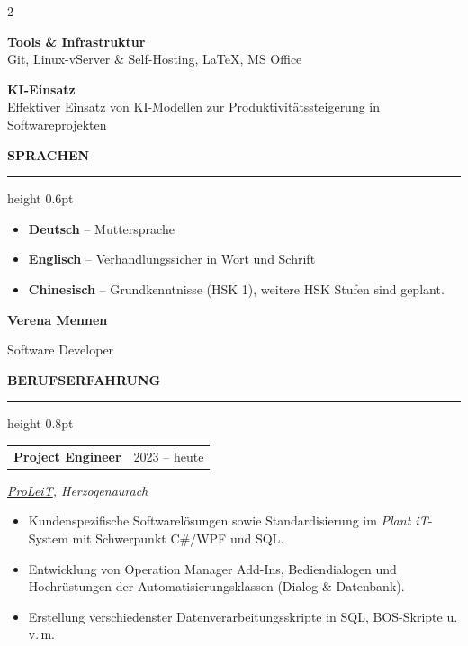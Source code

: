 \documentclass[10pt,a4paper]{article}
\makeatletter
\newcommand{\sideheading}[1]{%
  \vspace{11pt}%
  {\large\bfseries\color{accent}\MakeUppercase{#1}}\par
  \vspace{2pt}%
  {\color{rulecolor}\hrule height 0.6pt}%
  \vspace{6pt}%
}
\newcommand{\mainheading}[1]{%
  \vspace{12pt}%
  {\large\bfseries\color{accent}\MakeUppercase{#1}}\par
  \vspace{2pt}%
  {\color{accent}\hrule height 0.8pt}%
  \vspace{8pt}%
}
\newcommand{\cventry}[2]{%
  \begin{tabularx}{\linewidth}{@{}X@{\hspace{10pt}}r@{}}
    \textbf{#1} & {\small\color{textmuted}#2} \\
  \end{tabularx}\par\vspace{1pt}%
}
\makeatother
\begin{document}
\begin{paracol}{2}
\begin{leftcolumn}
\begin{minipage}[t]{\dimexpr\columnwidth-20pt\relax}
\vspace{6pt}
\textbf{Tools \& Infrastruktur}\\
Git, Linux-vServer \& Self-Hosting, LaTeX, MS Office


\vspace{6pt}
\textbf{KI-Einsatz}\\
Effektiver Einsatz von KI-Modellen zur Produktivitätssteigerung in Softwareprojekten

\sideheading{Sprachen}
\begin{itemize}[leftmargin=10pt, topsep=2pt, itemsep=3pt]
  \item \textbf{Deutsch} -- Muttersprache
  \item \textbf{Englisch} -- Verhandlungssicher in Wort und Schrift
  \item \textbf{Chinesisch} -- Grundkenntnisse (HSK 1), weitere HSK Stufen sind geplant.
\end{itemize}

\end{minipage}
\end{leftcolumn}

\begin{rightcolumn}
\vspace*{4pt}

{\Huge\bfseries\color{accent} Verena Mennen}\par
\vspace{3pt}
{\Large\color{textmuted} Software Developer}\par
\vspace{6pt}

\mainheading{Berufserfahrung}

\cventry{Project Engineer}{2023 -- heute}
{\small\textit{\href{https://www.proleit.de/}{ProLeiT}, Herzogenaurach}}
\begin{itemize}
  \item Kundenspezifische Softwarelösungen sowie Standardisierung im \textit{Plant iT}-System mit Schwerpunkt C\#/WPF und SQL.
  \item Entwicklung von Operation Manager Add-Ins, Bediendialogen und Hochrüstungen der Automatisierungsklassen (Dialog \& Datenbank).
  \item Erstellung verschiedenster Datenverarbeitungsskripte in SQL, BOS-Skripte u.\,v.\,m.
\end{itemize}
\vspace{9pt}


\end{rightcolumn}
\end{paracol}
\end{document}
